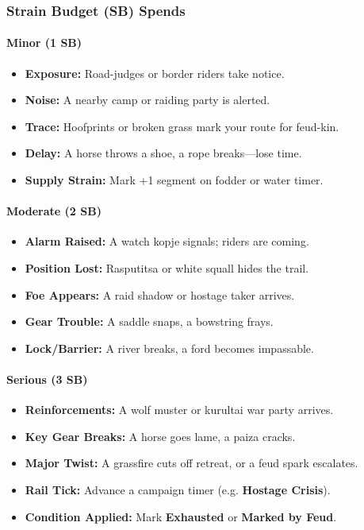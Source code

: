 \subsubsection{Strain Budget (SB) Spends}

\paragraph{Minor (1 SB)}
\begin{itemize}[nosep]
  \item \textbf{Exposure:} Road-judges or border riders take notice.
  \item \textbf{Noise:} A nearby camp or raiding party is alerted.
  \item \textbf{Trace:} Hoofprints or broken grass mark your route for feud-kin.
  \item \textbf{Delay:} A horse throws a shoe, a rope breaks---lose time.
  \item \textbf{Supply Strain:} Mark +1 segment on fodder or water timer.
\end{itemize}

\paragraph{Moderate (2 SB)}
\begin{itemize}[nosep]
  \item \textbf{Alarm Raised:} A watch kopje signals; riders are coming.
  \item \textbf{Position Lost:} Rasputitsa or white squall hides the trail.
  \item \textbf{Foe Appears:} A raid shadow or hostage taker arrives.
  \item \textbf{Gear Trouble:} A saddle snaps, a bowstring frays.
  \item \textbf{Lock/Barrier:} A river breaks, a ford becomes impassable.
\end{itemize}

\paragraph{Serious (3 SB)}
\begin{itemize}[nosep]
  \item \textbf{Reinforcements:} A wolf muster or kurultai war party arrives.
  \item \textbf{Key Gear Breaks:} A horse goes lame, a paiza cracks.
  \item \textbf{Major Twist:} A grassfire cuts off retreat, or a feud spark escalates.
  \item \textbf{Rail Tick:} Advance a campaign timer (e.g. \textbf{Hostage Crisis}).
  \item \textbf{Condition Applied:} Mark \textbf{Exhausted} or \textbf{Marked by Feud}.
\end{itemize}

